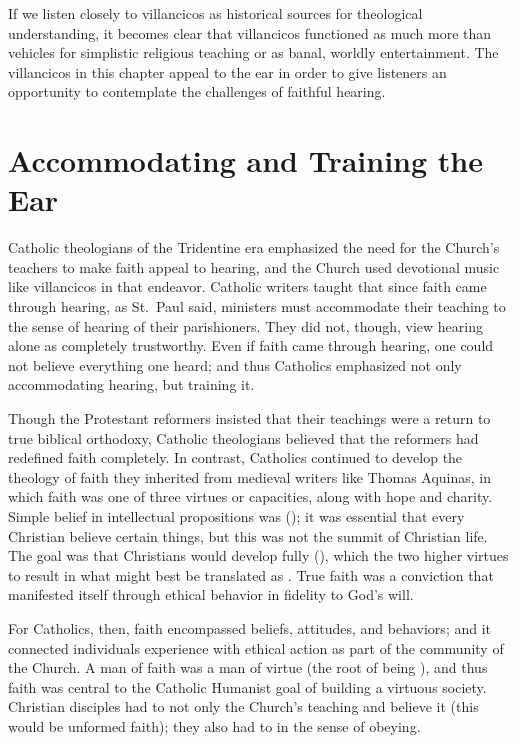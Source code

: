If we listen closely to villancicos as historical sources for theological 
understanding, it becomes clear that villancicos functioned as much more than 
vehicles for simplistic religious teaching or as banal, worldly entertainment.
The villancicos in this chapter appeal to the ear in order to give listeners an 
opportunity to contemplate the challenges of faithful hearing.

\section{Accommodating and Training the Ear}

Catholic theologians of the Tridentine era emphasized the need for the Church's 
teachers to make faith appeal to hearing, and the Church used devotional music 
like villancicos in that endeavor.
Catholic writers taught that since faith came through hearing, as St.\ Paul 
said, ministers must accommodate their teaching to the sense of hearing of 
their parishioners.
They did not, though, view hearing alone as completely trustworthy.
Even if faith came through hearing, one could not believe everything one heard; 
and thus Catholics emphasized not only accommodating hearing, but training it.

Though the Protestant reformers insisted that their teachings were a return to 
true biblical orthodoxy, Catholic theologians believed that the reformers had 
redefined faith completely.
In contrast, Catholics continued to develop the theology of faith they inherited 
from medieval writers like Thomas Aquinas, in which faith was one of three 
virtues or capacities, along with hope and charity.%
    \Autocite[130--132]{Schreiner:Certainty}
Simple belief in intellectual propositions was  
(); it was essential that every Christian believe certain 
things, but this was not the summit of Christian life.
The goal was that Christians would develop fully  
(), which  the two higher virtues to 
result in what might best be translated as .
True faith was a conviction that manifested itself through ethical behavior in 
fidelity to God's will.%
    \Autocite[, 15--20]{Catholic:Catechismus1614}

For Catholics, then, faith encompassed beliefs, attitudes, and behaviors; and 
it connected individuals experience with ethical action as part of the 
community of the Church.
A man of faith was a man of virtue (the root of  being 
), and thus faith was central to the Catholic Humanist goal of 
building a virtuous society.
Christian disciples had to not only  the Church's teaching and 
believe it (this would be unformed faith); they also had to  in 
the sense of obeying.


